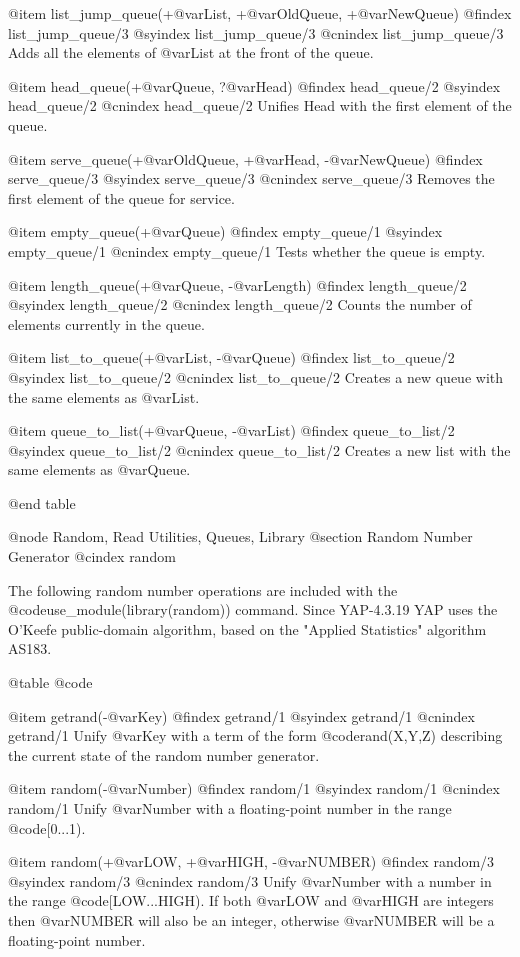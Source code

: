 @item list_jump_queue(+@var{List}, +@var{OldQueue}, +@var{NewQueue})
@findex list_jump_queue/3
@syindex list_jump_queue/3
@cnindex list_jump_queue/3
Adds all the elements of @var{List} at the front of the queue.

@item head_queue(+@var{Queue}, ?@var{Head})
@findex head_queue/2
@syindex head_queue/2
@cnindex head_queue/2
Unifies Head with the first element of the queue.

@item serve_queue(+@var{OldQueue}, +@var{Head}, -@var{NewQueue})
@findex serve_queue/3
@syindex serve_queue/3
@cnindex serve_queue/3
Removes the first element of the queue for service.

@item empty_queue(+@var{Queue})
@findex empty_queue/1
@syindex empty_queue/1
@cnindex empty_queue/1
Tests whether the queue is empty.

@item length_queue(+@var{Queue}, -@var{Length})
@findex length_queue/2
@syindex length_queue/2
@cnindex length_queue/2
Counts the number of elements currently in the queue.

@item list_to_queue(+@var{List}, -@var{Queue})
@findex list_to_queue/2
@syindex list_to_queue/2
@cnindex list_to_queue/2
Creates a new queue with the same elements as @var{List.}

@item queue_to_list(+@var{Queue}, -@var{List})
@findex queue_to_list/2
@syindex queue_to_list/2
@cnindex queue_to_list/2
Creates a new list with the same elements as @var{Queue}.

@end table


@node Random, Read Utilities, Queues, Library
@section Random Number Generator
@cindex random

The following random number operations are included with the
@code{use_module(library(random))} command. Since YAP-4.3.19 YAP uses
the O'Keefe public-domain algorithm, based on the "Applied Statistics"
algorithm AS183.

@table @code

@item getrand(-@var{Key})
@findex getrand/1
@syindex getrand/1
@cnindex getrand/1
Unify @var{Key} with a term of the form @code{rand(X,Y,Z)} describing the
current state of the random number generator.

@item random(-@var{Number})
@findex random/1
@syindex random/1
@cnindex random/1
Unify @var{Number} with a floating-point number in the range @code{[0...1)}.

@item random(+@var{LOW}, +@var{HIGH}, -@var{NUMBER})
@findex random/3
@syindex random/3
@cnindex random/3
Unify @var{Number} with a number in the range
@code{[LOW...HIGH)}. If both @var{LOW} and @var{HIGH} are
integers then @var{NUMBER} will also be an integer, otherwise
@var{NUMBER} will be a floating-point number.

